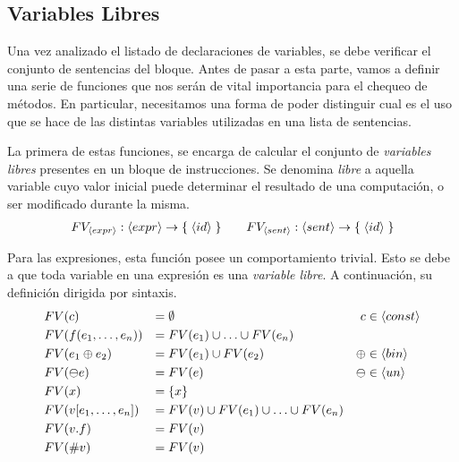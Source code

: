 \documentclass{article}
\begin{document}
\subsection{Variables Libres}

Una vez analizado el listado de declaraciones de variables, se debe verificar el conjunto de sentencias del bloque.
Antes de pasar a esta parte, vamos a definir una serie de funciones que nos serán de vital importancia para el chequeo de métodos.
En particular, necesitamos una forma de poder distinguir cual es el uso que se hace de las distintas variables utilizadas en una lista de sentencias.

La primera de estas funciones, se encarga de calcular el conjunto de \textit{variables libres} presentes en un bloque de instrucciones.
Se denomina \textit{libre} a aquella variable cuyo valor inicial puede determinar el resultado de una computación, o ser modificado durante la misma.
\begin{gather*}
FV_{\langle expr \rangle}: \langle expr \rangle \rightarrow \{ \; \langle id \rangle \; \}
\qquad
FV_{\langle sent \rangle}: \langle sent \rangle \rightarrow \{ \; \langle id \rangle \; \}
\end{gather*}

Para las expresiones, esta función posee un comportamiento trivial.
Esto se debe a que toda variable en una expresión es una \textit{variable libre}.
A continuación, su definición dirigida por sintaxis.
\begin{align*}
&FV(c)
&=&\;
\emptyset
&c &\in \langle const \rangle
\\
&FV(f(e_1, \ldots, e_n))
&=&\;
FV(e_1) \cup \ldots \cup FV(e_n)
\\
&FV(e_1 \oplus e_2)
&=&\;
FV(e_1) \cup FV(e_2)
&\oplus &\in \langle bin \rangle
\\
&FV(\ominus e)
&=&\;
FV(e)
&\ominus &\in \langle un \rangle
\\
&FV(x)
&=&\;
\{ x \}
\\
&FV(v [e_1, \ldots, e_n])
&=&\;
FV(v) \cup FV(e_1) \cup \ldots \cup FV(e_n)
\\
&FV(v.f)
&=&\;
FV(v)
\\
&FV(\# v)
&=&\;
FV(v)
\end{align*}
\end{document}
